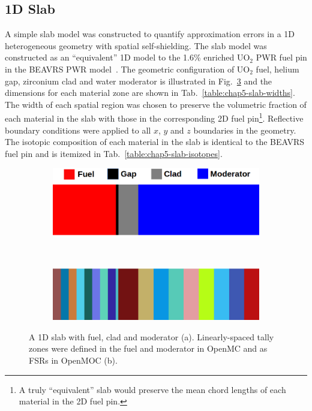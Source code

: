 \subsection{1D Slab}
\label{subsec:chap5-slab}

A simple slab model was constructed to quantify approximation errors in a 1D heterogeneous geometry with spatial self-shielding. The slab model was constructed as an ``equivalent'' 1D model to the 1.6\% enriched UO$_2$ \ac{PWR} fuel pin in the \ac{BEAVRS} \ac{PWR} model~\cite{horelik2013beavrs}. The geometric configuration of UO$_2$ fuel, helium gap, zirconium clad and water moderator is illustrated in Fig.~\ref{fig:chap5-slab} and the dimensions for each material zone are shown in Tab.~\ref{table:chap5-slab-widths}. The width of each spatial region was chosen to preserve the volumetric fraction of each material in the slab with those in the corresponding 2D fuel pin\footnote{A truly ``equivalent'' slab would preserve the mean chord lengths of each material in the 2D fuel pin.}. Reflective boundary conditions were applied to all $x$, $y$ and $z$ boundaries in the geometry. The isotopic composition of each material in the slab is identical to the \ac{BEAVRS} fuel pin and is itemized in Tab.~\ref{table:chap5-slab-isotopes}. 

\begin{figure}[h!]
\begin{subfigure}{\textwidth}
  \centering
  \includegraphics[width=0.7\linewidth]{figures/biases/slab/slab-simple-labels}
  \caption{}
  \label{fig:chap5-slab-a}
\end{subfigure} \\
\begin{subfigure}{\textwidth}
  \centering
  \includegraphics[width=0.7\linewidth]{figures/biases/slab/slab-8x}
  \caption{}
  \label{fig:chap5-slab-b}
\end{subfigure}
\caption[1D slab materials and geometry]{A 1D slab with fuel, clad and moderator (a). Linearly-spaced tally zones were defined in the fuel and moderator in OpenMC and as \ac{FSR}s in OpenMOC (b).}
\label{fig:chap5-slab}
\end{figure}

